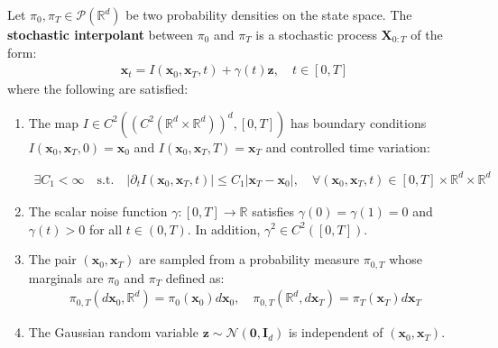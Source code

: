 \documentclass{article}
\begin{document}
\begin{definition}\label{def:stochastic-interpolants}
    Let $\pi_0, \pi_T\in \mathcal{P}(\mathbb{R}^d)$ be two probability densities on the state space. The \textbf{stochastic interpolant} between $\pi_0$ and $\pi_T$ is a stochastic process $\boldsymbol{X}_{0:T}$ of the form:
    \begin{align}
        \boldsymbol{x}_t=I(\boldsymbol{x}_0, \boldsymbol{x}_T,t)+\gamma(t)\boldsymbol{z}, \quad t\in [0,T]
    \end{align}
    where the following are satisfied:
    \begin{enumerate}
        \item [(i)] The map $I\in C^2((C^2(\mathbb{R}^d\times \mathbb{R}^d))^d, [0,T])$ has boundary conditions $I(\boldsymbol{x}_0, \boldsymbol{x}_T,0)=\boldsymbol{x}_0$ and $I(\boldsymbol{x}_0, \boldsymbol{x}_T,T)=\boldsymbol{x}_T$ and controlled time variation:
        \begin{small}
        \begin{align}
            \exists C_1< \infty\quad \text{s.t.}\quad|\partial_tI(\boldsymbol{x}_0, \boldsymbol{x}_T,t)|\leq C_1|\boldsymbol{x}_T-\boldsymbol{x}_0|, \quad \forall (\boldsymbol{x}_0, \boldsymbol{x}_T,t)\in[0,T]\times\mathbb{R}^d\times \mathbb{R}^d
        \end{align}
        \end{small}
        \item[(ii)] The scalar noise function $\gamma: [0,T]\to \mathbb{R}$ satisfies $\gamma(0)=\gamma(1)=0$ and $\gamma(t)> 0$ for all $t\in (0,T)$. In addition, $\gamma^2\in C^2([0,T])$.
        \item[(iii)] The pair $(\boldsymbol{x}_0, \boldsymbol{x}_T)$ are sampled from a probability measure $\pi_{0,T}$ whose marginals are $\pi_0$ and $\pi_T$ defined as:
        \begin{align}
            \pi_{0,T}(d\boldsymbol{x}_0, \mathbb{R}^d)=\pi_0(\boldsymbol{x}_0)d\boldsymbol{x}_0, \quad\pi_{0,T}(\mathbb{R}^d, d\boldsymbol{x}_T)=\pi_T(\boldsymbol{x}_T)d\boldsymbol{x}_T
        \end{align}
        \item[(iv)] The Gaussian random variable $\boldsymbol{z}\sim \mathcal{N}(\boldsymbol{0}, \boldsymbol{I}_d)$ is independent of $(\boldsymbol{x}_0, \boldsymbol{x}_T)$.
    \end{enumerate}
\end{definition}
\end{document}
